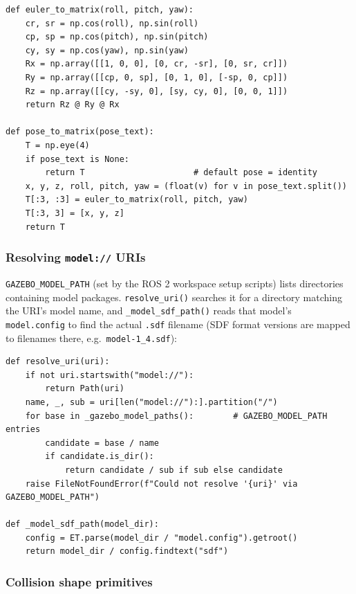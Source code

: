 \documentclass[11pt]{article}
\begin{document}
\begin{lstlisting}[caption={\texttt{gazebo\_geometry.py}: shared rotation and pose-matrix helpers}]
def euler_to_matrix(roll, pitch, yaw):
    cr, sr = np.cos(roll), np.sin(roll)
    cp, sp = np.cos(pitch), np.sin(pitch)
    cy, sy = np.cos(yaw), np.sin(yaw)
    Rx = np.array([[1, 0, 0], [0, cr, -sr], [0, sr, cr]])
    Ry = np.array([[cp, 0, sp], [0, 1, 0], [-sp, 0, cp]])
    Rz = np.array([[cy, -sy, 0], [sy, cy, 0], [0, 0, 1]])
    return Rz @ Ry @ Rx

def pose_to_matrix(pose_text):
    T = np.eye(4)
    if pose_text is None:
        return T                      # default pose = identity
    x, y, z, roll, pitch, yaw = (float(v) for v in pose_text.split())
    T[:3, :3] = euler_to_matrix(roll, pitch, yaw)
    T[:3, 3] = [x, y, z]
    return T
\end{lstlisting}

\subsubsection{Resolving \texttt{model://} URIs}

\texttt{GAZEBO\_MODEL\_PATH} (set by the ROS 2 workspace setup scripts) lists
directories containing model packages. \texttt{resolve\_uri()} searches it
for a directory matching the URI's model name, and \texttt{\_model\_sdf\_path()}
reads that model's \texttt{model.config} to find the actual \texttt{.sdf}
filename (SDF format versions are mapped to filenames there, e.g.\
\texttt{model-1\_4.sdf}):

\begin{lstlisting}[caption={\texttt{gazebo\_geometry.py}: URI resolution (excerpt)}]
def resolve_uri(uri):
    if not uri.startswith("model://"):
        return Path(uri)
    name, _, sub = uri[len("model://"):].partition("/")
    for base in _gazebo_model_paths():        # GAZEBO_MODEL_PATH entries
        candidate = base / name
        if candidate.is_dir():
            return candidate / sub if sub else candidate
    raise FileNotFoundError(f"Could not resolve '{uri}' via GAZEBO_MODEL_PATH")

def _model_sdf_path(model_dir):
    config = ET.parse(model_dir / "model.config").getroot()
    return model_dir / config.findtext("sdf")
\end{lstlisting}

\subsubsection{Collision shape primitives}
\end{document}
